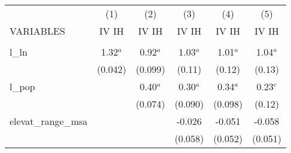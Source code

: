 \documentclass[]{article}
\begin{document}
\begin{tabular}{lccccc} \hline
 & (1) & (2) & (3) & (4) & (5) \\
VARIABLES & IV IH & IV IH & IV IH & IV IH & IV IH \\ \hline
 &  &  &  &  &  \\
l\_ln & 1.32$^a$ & 0.92$^a$ & 1.03$^a$ & 1.01$^a$ & 1.04$^a$ \\
 & (0.042) & (0.099) & (0.11) & (0.12) & (0.13) \\
l\_pop &  & 0.40$^a$ & 0.30$^a$ & 0.34$^a$ & 0.23$^c$ \\
 &  & (0.074) & (0.090) & (0.098) & (0.12) \\
elevat\_range\_msa &  &  & -0.026 & -0.051 & -0.058 \\
 &  &  & (0.058) & (0.052) & (0.051) \\

\end{tabular}
\end{document}

